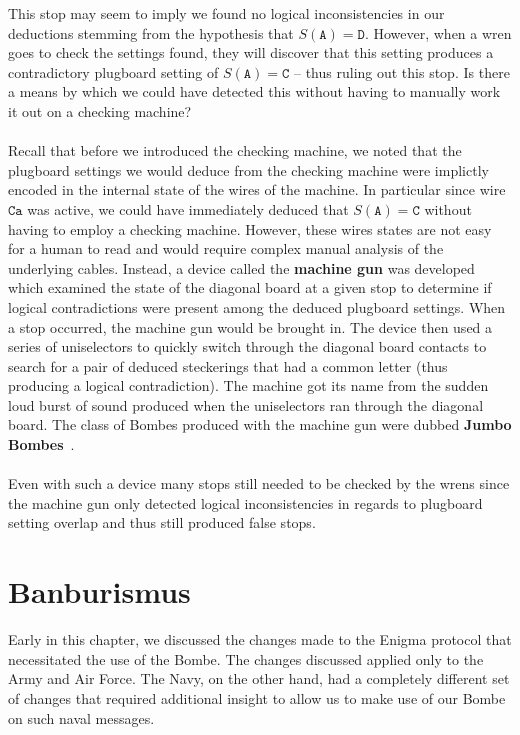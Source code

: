 This stop may seem to imply we found no logical inconsistencies in our
deductions stemming from the hypothesis that $S(\texttt{A}) =
\texttt{D}$. However, when a wren goes to check the settings found,
they will discover that this setting produces a contradictory
plugboard setting of $S(\texttt{A}) = \texttt{C}$ -- thus ruling out
this stop. Is there a means by which we could have detected this
without having to manually work it out on a checking machine?
\\\\Recall that before we introduced the checking machine, we noted
that the plugboard settings we would deduce from the checking machine
were implictly encoded in the internal state of the wires of the
machine. In particular since wire $\texttt{Ca}$ was active, we could
have immediately deduced that $S(\texttt{A})= \texttt{C}$ without
having to employ a checking machine. However, these wires states are
not easy for a human to read and would require complex manual
analysis of the underlying cables. Instead, a device called the
{\bf{machine gun}} was developed which examined the state of the
diagonal board at a given stop to determine if logical contradictions
were present among the deduced plugboard settings. When a stop
occurred, the machine gun would be brought in. The device then used a
series of uniselectors to quickly switch through the diagonal board
contacts to search for a pair of deduced steckerings that had a
common letter (thus producing a logical contradiction). The machine
got its name from the sudden loud burst of sound produced when the
uniselectors ran through the diagonal board. The class of Bombes
produced with the machine gun were dubbed {\bf{Jumbo Bombes}}~\cite[p.~240]{BudianskyBattleOfWits2000}.
\\\\Even with such a device many stops still needed to be checked by
the wrens since the machine gun only detected logical inconsistencies
in regards to plugboard setting overlap and thus still produced false stops.

\section{Banburismus}\label{banburismus}
Early in this chapter, we discussed the changes made to the Enigma
protocol that necessitated the use of the Bombe. The changes
discussed applied only to the Army and Air Force. The Navy, on the
other hand, had a completely different set of changes that required
additional insight to allow us to make use of our Bombe on such naval messages.

